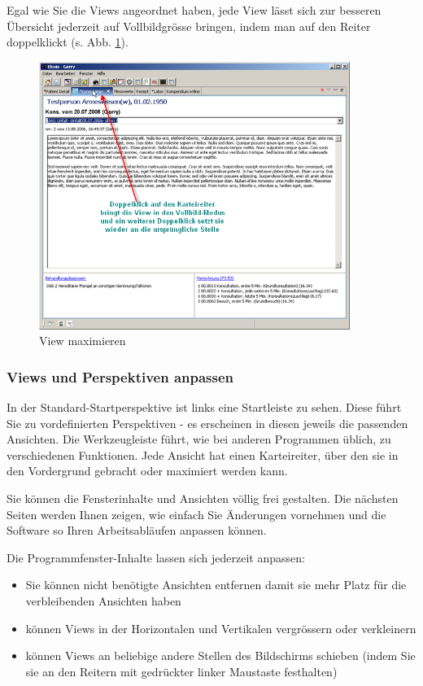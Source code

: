 Egal wie Sie die Views angeordnet haben, jede View lässt sich zur besseren
Übersicht jederzeit auf Vollbildgrösse bringen, indem man auf den Reiter
doppelklickt (s. Abb. \ref{fig:tour3}).

\begin{figure}[htp]
\begin{center}
  \includegraphics[width=0.9\textwidth]{images/tour3}
  \caption{View maximieren}
  \label{fig:tour3}
\end{center}
\end{figure}

\subsubsection{Views und Perspektiven anpassen}


In der Standard-Startperspektive ist links eine \glqq Startleiste\grqq{} zu
sehen. Diese führt Sie zu vordefinierten Perspektiven - es erscheinen in diesen
jeweils die passenden Ansichten. Die Werkzeugleiste führt, wie bei anderen
Programmen üblich, zu verschiedenen Funktionen. Jede Ansicht hat einen
Karteireiter, über den sie in den Vordergrund gebracht oder maximiert werden kann.

Sie können die Fensterinhalte und Ansichten völlig frei gestalten. Die nächsten Seiten werden Ihnen zeigen,
wie einfach Sie Änderungen vornehmen und die Software so Ihren Arbeitsabläufen anpassen können.

Die Programmfenster-Inhalte lassen sich jederzeit anpassen:
\begin{itemize}
  \item Sie können nicht benötigte Ansichten entfernen damit sie mehr Platz für
  die verbleibenden Ansichten haben
	\item können Views in der Horizontalen und Vertikalen vergrössern oder verkleinern
	\item können Views an beliebige andere Stellen des Bildschirms schieben (indem Sie sie
	an den Reitern mit gedrückter linker Maustaste \glqq festhalten\grqq{})
\end{itemize}

